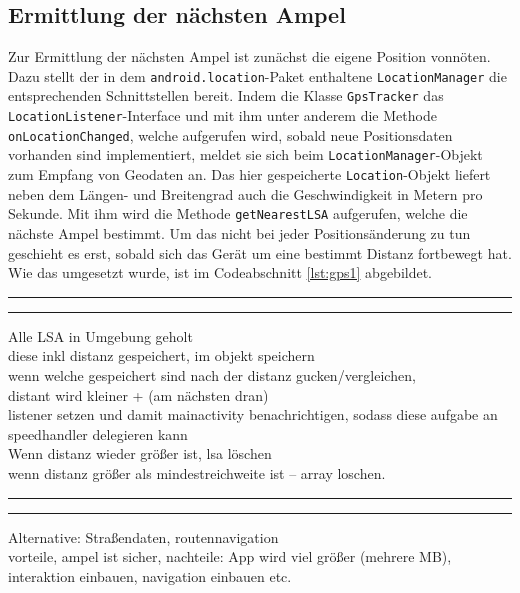 \subsection{Ermittlung der nächsten Ampel}
Zur Ermittlung der nächsten Ampel ist zunächst die eigene Position vonnöten. Dazu stellt der in dem \texttt{android.location}-Paket enthaltene \texttt{LocationManager} die entsprechenden Schnittstellen bereit. Indem die Klasse \texttt{GpsTracker} das \texttt{LocationListener}-Interface und mit ihm unter anderem die Methode \texttt{onLocationChanged}, welche aufgerufen wird, sobald neue Positionsdaten vorhanden sind implementiert, meldet sie sich beim \texttt{LocationManager}-Objekt zum Empfang von Geodaten an. Das hier gespeicherte \texttt{Location}-Objekt liefert neben dem Längen- und Breitengrad auch die Geschwindigkeit in Metern pro Sekunde. Mit ihm wird die Methode \texttt{getNearestLSA} aufgerufen, welche die nächste Ampel bestimmt. Um das nicht bei jeder Positionsänderung zu tun geschieht es erst, sobald sich das Gerät um eine bestimmt Distanz fortbewegt hat. Wie das umgesetzt wurde, ist im Codeabschnitt \ref{lst:gps1} abgebildet.\\
\begin{center}
\rule{35em}{0.5pt}

\rule{35em}{0.5pt}
\end{center}

Alle LSA in Umgebung geholt\\
diese inkl distanz gespeichert, im objekt speichern\\
wenn welche gespeichert sind nach der distanz gucken/vergleichen, \\
distant wird kleiner + (am nächsten dran) \\
listener setzen und damit mainactivity benachrichtigen, sodass diese aufgabe an speedhandler delegieren kann\\
Wenn distanz wieder größer ist, lsa löschen\\
wenn distanz größer als mindestreichweite ist -- array loschen. \\
\begin{center}
\rule{35em}{0.5pt}

\rule{35em}{0.5pt}
\end{center}
Alternative: Straßendaten, routennavigation\\ vorteile, ampel ist sicher, nachteile:
App wird viel größer (mehrere MB),  interaktion einbauen, navigation einbauen etc. 
%
%
